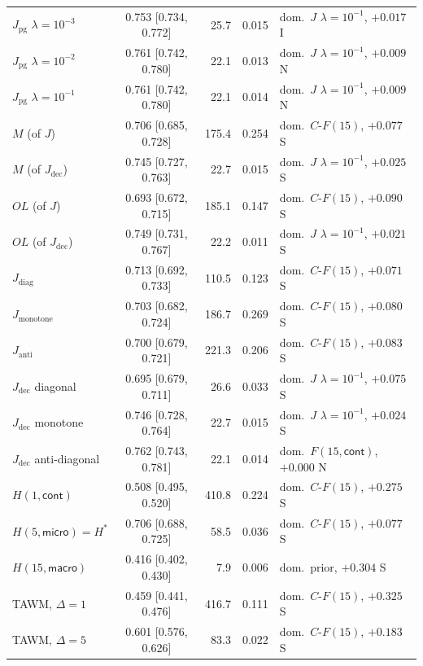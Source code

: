 {\begin{revblock}
\begin{longtable}{@{}lcrrl@{}}
$J_{\mathrm{pg}}$ $\lambda{=}10^{-3}$ & 0.753 [0.734, 0.772] & 25.7 & 0.015 & dom.\ $J$ $\lambda{=}10^{-1}$, $+0.017$ I \\
$J_{\mathrm{pg}}$ $\lambda{=}10^{-2}$ & 0.761 [0.742, 0.780] & 22.1 & 0.013 & dom.\ $J$ $\lambda{=}10^{-1}$, $+0.009$ N \\
$J_{\mathrm{pg}}$ $\lambda{=}10^{-1}$ & 0.761 [0.742, 0.780] & 22.1 & 0.014 & dom.\ $J$ $\lambda{=}10^{-1}$, $+0.009$ N \\
$M$ (of $J$) & 0.706 [0.685, 0.728] & 175.4 & 0.254 & dom.\ $C\text{-}F(15)$, $+0.077$ S \\
$M$ (of $J_{\mathrm{dec}}$) & 0.745 [0.727, 0.763] & 22.7 & 0.015 & dom.\ $J$ $\lambda{=}10^{-1}$, $+0.025$ S \\
$OL$ (of $J$) & 0.693 [0.672, 0.715] & 185.1 & 0.147 & dom.\ $C\text{-}F(15)$, $+0.090$ S \\
$OL$ (of $J_{\mathrm{dec}}$) & 0.749 [0.731, 0.767] & 22.2 & 0.011 & dom.\ $J$ $\lambda{=}10^{-1}$, $+0.021$ S \\
$J_{\mathrm{diag}}$ & 0.713 [0.692, 0.733] & 110.5 & 0.123 & dom.\ $C\text{-}F(15)$, $+0.071$ S \\
$J_{\mathrm{monotone}}$ & 0.703 [0.682, 0.724] & 186.7 & 0.269 & dom.\ $C\text{-}F(15)$, $+0.080$ S \\
$J_{\mathrm{anti}}$ & 0.700 [0.679, 0.721] & 221.3 & 0.206 & dom.\ $C\text{-}F(15)$, $+0.083$ S \\
$J_{\mathrm{dec}}$ diagonal & 0.695 [0.679, 0.711] & 26.6 & 0.033 & dom.\ $J$ $\lambda{=}10^{-1}$, $+0.075$ S \\
$J_{\mathrm{dec}}$ monotone & 0.746 [0.728, 0.764] & 22.7 & 0.015 & dom.\ $J$ $\lambda{=}10^{-1}$, $+0.024$ S \\
$J_{\mathrm{dec}}$ anti-diagonal & 0.762 [0.743, 0.781] & 22.1 & 0.014 & dom.\ $F(15,\textsf{cont})$, $+0.000$ N \\
$H(1,\textsf{cont})$ & 0.508 [0.495, 0.520] & 410.8 & 0.224 & dom.\ $C\text{-}F(15)$, $+0.275$ S \\
$H(5,\textsf{micro})=H^{*}$ & 0.706 [0.688, 0.725] & 58.5 & 0.036 & dom.\ $C\text{-}F(15)$, $+0.077$ S \\
$H(15,\textsf{macro})$ & 0.416 [0.402, 0.430] & 7.9 & 0.006 & dom.\ prior, $+0.304$ S \\
TAWM, $\Delta=1$ & 0.459 [0.441, 0.476] & 416.7 & 0.111 & dom.\ $C\text{-}F(15)$, $+0.325$ S \\
TAWM, $\Delta=5$ & 0.601 [0.576, 0.626] & 83.3 & 0.022 & dom.\ $C\text{-}F(15)$, $+0.183$ S \\

\end{longtable}
\end{revblock}}
